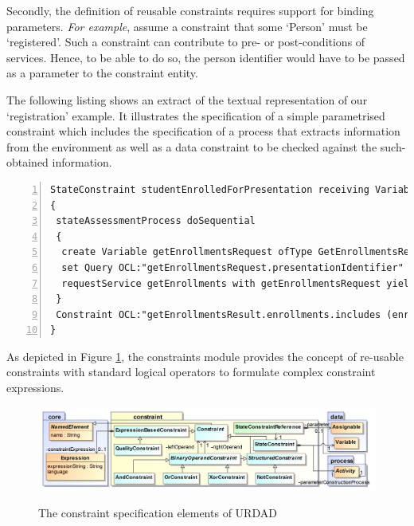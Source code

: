 Secondly, the definition of reusable constraints requires support for binding parameters. \emph{For example}, assume a constraint that some `Person' must be `registered'. Such a constraint can contribute to pre- or post-conditions of services. Hence, to be able to do so, the person identifier would have to be passed as a parameter to the constraint entity. 

The following listing shows an extract of the textual representation of our `registration' example. It illustrates the specification of a simple parametrised constraint which includes the specification of a process that extracts information from the environment as well as a data constraint to be checked against the such-obtained information.
\lstset{language=urdad,caption=Specifying a state constraint in the textual URDAD DSL syntax.,label=constraintTextSyntax}
\begin{lstlisting}[numbers=left,escapechar=|]
StateConstraint studentEnrolledForPresentation receiving Variable enrollForPresentationRequest ofType EnrollForPresentationRequest
{
 stateAssessmentProcess doSequential
 {
  create Variable getEnrollmentsRequest ofType GetEnrollmentsRequest
  set Query OCL:"getEnrollmentsRequest.presentationIdentifier" equalTo Query OCL:"enrollForPresentationRequest.presentationIdentifier"
  requestService getEnrollments with getEnrollmentsRequest yielding Variable getEnrollmentsResult ofType GetEnrollmentsResult
 }
 Constraint OCL:"getEnrollmentsResult.enrollments.includes (enrollForPresentationRequest.personIdentifier)"
}
\end{lstlisting}

As depicted in Figure \ref{fig:constraintModule}, the constraints module provides the concept of re-usable constraints with standard logical operators to formulate complex constraint expressions.
\begin{figure}[thbp]
  \centering
  \includegraphics[width=\pagewidth]{constraint}\\   
  \caption{The constraint specification elements of URDAD}
  \label{fig:constraintModule}
\end{figure}

